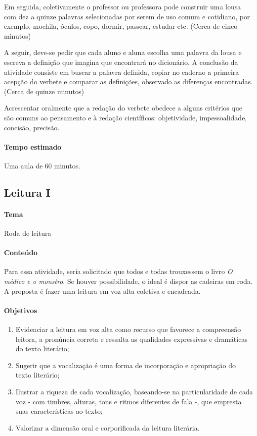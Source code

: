 \documentclass[12pt]{extarticle}
\begin{document}
Em seguida, coletivamente o professor ou professora pode construir uma
lousa com dez a quinze palavras selecionadas por serem de uso comum e
cotidiano, por exemplo, mochila, óculos, copo, dormir, passear, estudar
etc. (Cerca de cinco minutos)

A seguir, deve-se pedir que cada aluno e aluna escolha uma palavra da
lousa e escreva a definição que imagina que encontrará no dicionário. A
conclusão da atividade consiste em buscar a palavra definida, copiar no
caderno a primeira acepção do verbete e comparar as definições,
observado as diferenças encontradas. (Cerca de quinze minutos)

Acrescentar oralmente que a redação do verbete obedece a alguns
critérios que são comuns ao pensamento e à redação científicos:
objetividade, impessoalidade, concisão, precisão.

\paragraph{Tempo estimado} Uma aula de 60 minutos.

\subsection{Leitura I}

\paragraph{Tema} Roda de leitura


\paragraph{Conteúdo}
Para essa atividade, seria solicitado que todos e todas trouxessem o
livro \emph{O médico e o monstro}. Se houver possibilidade, o ideal é
dispor as cadeiras em roda. A proposta é fazer uma leitura em voz alta
coletiva e encadeada.

\paragraph{Objetivos}
\begin{enumerate}
\item
Evidenciar a leitura em voz alta como recurso que favorece a
compreensão leitora, a pronúncia correta e ressalta as qualidades
expressivas e dramáticas do texto literário;

\item
Sugerir que a vocalização é uma forma de incorporação e apropriação do texto
literário;

\item
Ilustrar a riqueza de cada vocalização, baseando-se na
particularidade de cada voz - com timbres, alturas, tons e ritmos
diferentes de fala -, que empresta suas características ao texto;

\item
Valorizar a dimensão oral e corporificada da leitura literária.
\end{enumerate}
\end{document}
